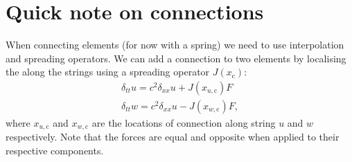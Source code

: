 \documentclass[dvipsnames]{article}
\begin{document}


\section{Quick note on connections}
When connecting elements (for now with a spring) we need to use interpolation and spreading operators. We can add a connection to two elements by localising the along the strings using a spreading operator $J(x_\text{c})$:
\begin{align}\label{eq:twoConnectedStrings}
    \delta_{tt}u = c^2 \delta_{xx}u + J(x_{u,\text{c}})F\\
    \delta_{tt}w = c^2 \delta_{xx}u - J(x_{w,\text{c}})F,
\end{align}
where $x_{u,\text{c}}$ and $x_{w,\text{c}}$ are the locations of connection along string $u$ and $w$ respectively. Note that the forces are equal and opposite when applied to their respective components. 
\end{document}
